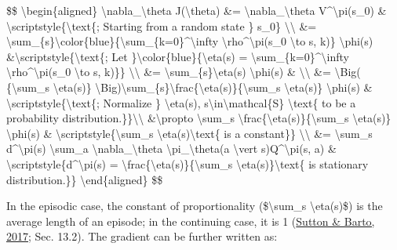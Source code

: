 \$\$ \textbackslash begin\{aligned\} \textbackslash nabla\_\textbackslash theta J(\textbackslash theta) \&= \textbackslash nabla\_\textbackslash theta V\^{}\textbackslash pi(s\_0) \& \textbackslash scriptstyle\{\textbackslash text\{; Starting from a random state \} s\_0\} \textbackslash\textbackslash{} \&= \textbackslash sum\_\{s\}\textbackslash color\{blue\}\{\textbackslash sum\_\{k=0\}\^{}\textbackslash infty \textbackslash rho\^{}\textbackslash pi(s\_0 \textbackslash to s, k)\} \textbackslash phi(s) \&\textbackslash scriptstyle\{\textbackslash text\{; Let \}\textbackslash color\{blue\}\{\textbackslash eta(s) = \textbackslash sum\_\{k=0\}\^{}\textbackslash infty \textbackslash rho\^{}\textbackslash pi(s\_0 \textbackslash to s, k)\}\} \textbackslash\textbackslash{} \&= \textbackslash sum\_\{s\}\textbackslash eta(s) \textbackslash phi(s) \& \textbackslash\textbackslash{} \&= \textbackslash Big( \{\textbackslash sum\_s \textbackslash eta(s)\} \textbackslash Big)\textbackslash sum\_\{s\}\textbackslash frac\{\textbackslash eta(s)\}\{\textbackslash sum\_s \textbackslash eta(s)\} \textbackslash phi(s) \& \textbackslash scriptstyle\{\textbackslash text\{; Normalize \} \textbackslash eta(s), s\textbackslash in\textbackslash mathcal\{S\} \textbackslash text\{ to be a probability distribution.\}\}\textbackslash\textbackslash{} \&\textbackslash propto \textbackslash sum\_s \textbackslash frac\{\textbackslash eta(s)\}\{\textbackslash sum\_s \textbackslash eta(s)\} \textbackslash phi(s) \& \textbackslash scriptstyle\{\textbackslash sum\_s \textbackslash eta(s)\textbackslash text\{ is a constant\}\} \textbackslash\textbackslash{} \&= \textbackslash sum\_s d\^{}\textbackslash pi(s) \textbackslash sum\_a \textbackslash nabla\_\textbackslash theta \textbackslash pi\_\textbackslash theta(a \textbackslash vert s)Q\^{}\textbackslash pi(s, a) \& \textbackslash scriptstyle\{d\^{}\textbackslash pi(s) = \textbackslash frac\{\textbackslash eta(s)\}\{\textbackslash sum\_s \textbackslash eta(s)\}\textbackslash text\{ is stationary distribution.\}\} \textbackslash end\{aligned\} \$\$

In the episodic case, the constant of proportionality (\$\textbackslash sum\_s \textbackslash eta(s)\$) is the average length of an episode; in the continuing case, it is 1 (\href{http://incompleteideas.net/book/bookdraft2017nov5.pdf}{Sutton \& Barto, 2017}; Sec. 13.2). The gradient can be further written as:

